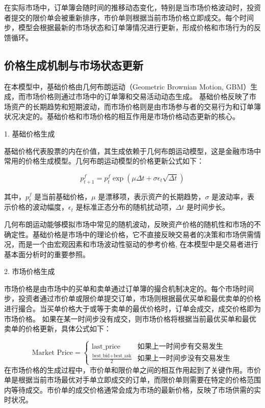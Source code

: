在实际市场中，订单簿会随时间的推移动态变化，特别是当市场价格波动时，投资者提交的限价单会被重新排序，市价单则根据当前市场价格立即成交。每个时间步，模型会根据最新的市场状态和订单簿情况进行更新，形成价格和市场行为的反馈循环。





\subsection{价格生成机制与市场状态更新}

在本模型中，基础价格由几何布朗运动（Geometric Brownian Motion, GBM）生成，而市场价格则通过市场中的订单簿和交易活动动态生成。
基础价格反映了市场资产的长期趋势和短期波动，而市场价格则是由市场参与者的交易行为和订单簿状况决定的。基础价格和市场价格的相互作用是市场价格动态更新的核心。

1. 基础价格生成

基础价格代表股票的内在价值，其生成依赖于几何布朗运动模型，这是金融市场中常用的价格生成模型。几何布朗运动模型的价格更新公式如下：

\begin{equation}
    p_{t+1}^{f} = p_t^{f} \exp\left( \mu \Delta t + \sigma \epsilon_t \sqrt{\Delta t} \right)
\end{equation}

其中，\( p_{t}^{f} \) 是当前基础价格，\( \mu \) 是漂移项，表示资产的长期趋势，\( \sigma \) 是波动率，表示价格的波动幅度，\( \epsilon_t \) 是标准正态分布的随机扰动项，\(\Delta t\) 是时间步长。

几何布朗运动能够模拟市场中常见的随机波动，反映资产价格的随机性和市场的不确定性。基础价格是市场中的理论价格，它不直接反映交易者的决策和市场供需情况，而是一个由宏观因素和市场波动性驱动的参考价格, 在本模型中是交易者进行基本面分析时的重要参照。

2. 市场价格生成

市场价格是由市场中的买单和卖单通过订单簿的撮合机制决定的。每个市场时间步，投资者通过市价单或限价单提交订单，市场则根据最优买单和最优卖单的价格进行撮合。当买单价格大于或等于卖单的最优价格时，订单会成交，成交价格即为市场价格。
如果在某一时间步没有成交，则市场价格将根据当前最优买单和最优卖单的价格更新，具体公式如下：

\begin{equation}
    \text{Market Price} = 
    \begin{cases} 
    \text{last\_price} & \text{如果上一时间步有交易发生} \\
    \frac{\text{best\_bid} + \text{best\_ask}}{2} & \text{如果上一时间步没有交易发生}
    \end{cases}
\end{equation}
在市场价格的生成过程中，市价单和限价单之间的相互作用起到了关键作用。市价单是根据当前市场最优对手单立即成交的订单，而限价单则需要在特定的价格范围内等待成交。市价单的成交价格通常会成为市场的最新价格，反映了市场供需的实时状况。





